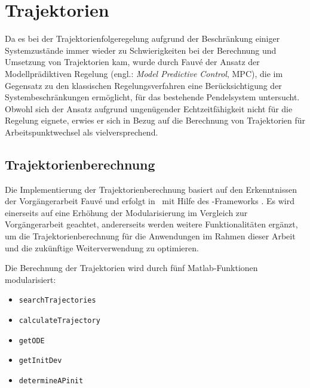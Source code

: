 \chapter{Trajektorien}\label{cha:trj}

Da es bei der Trajektorienfolgeregelung aufgrund der Beschränkung einiger Systemzustände immer wieder zu Schwierigkeiten bei der Berechnung und Umsetzung von Trajektorien kam, wurde durch Fauvé \cite{fauve} der Ansatz der Modellprädiktiven Regelung (engl.: \textit{Model Predictive Control}, MPC), die im Gegensatz zu den klassischen Regelungsverfahren eine Berücksichtigung der Systembeschränkungen ermöglicht, für das bestehende Pendelsystem untersucht. Obwohl sich der Ansatz aufgrund ungenügender Echtzeitfähigkeit nicht für die Regelung eignete, erwies er sich in Bezug auf die Berechnung von Trajektorien für Arbeitspunktwechsel als vielversprechend. 


\section{Trajektorienberechnung}

Die Implementierung der Trajektorienberechnung basiert auf den Erkenntnissen der Vorgängerarbeit Fauvé \cite{fauve} und erfolgt in \Matlab\ mit Hilfe des \casadi-Frameworks \cite{Andersson2019}. Es wird einerseits auf eine Erhöhung der Modularisierung im Vergleich zur Vorgängerarbeit geachtet, andererseits werden weitere Funktionalitäten ergänzt, um die Trajektorienberechnung für die Anwendungen im Rahmen dieser Arbeit und die zukünftige Weiterverwendung zu optimieren.

Die Berechnung der Trajektorien wird durch fünf Matlab-Funktionen modularisiert:
\begin{itemize}
	\item \texttt{searchTrajectories}
	\item \texttt{calculateTrajectory}
	\item \texttt{getODE}
	\item \texttt{getInitDev}
	\item \texttt{determineAPinit}
\end{itemize}

